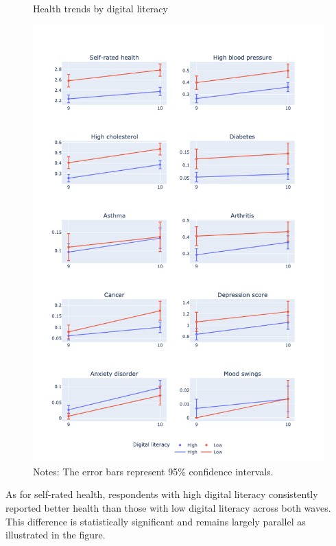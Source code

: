 \begin{figure}
    \centering
    \caption{Health trends by digital literacy}
    \label{fig:desc_stats_rq2}
    \includegraphics[width=\textwidth]{figures/desc_stats_q2.png}
    \caption*{Notes: The error bars represent 95\% confidence intervals.}
\end{figure}

As for self-rated health, respondents with high digital literacy consistently reported better health than those with low digital literacy across both waves. This difference is statistically significant and remains largely parallel as illustrated in the figure.


